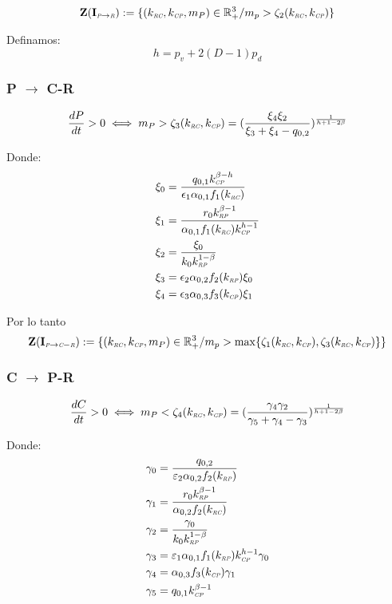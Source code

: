 \begin{equation}
\mathbf{Z(I_{\textit{\tiny P} \to \textit{\tiny R}})} := \{ (k_{\textit{\tiny RC}},k_{\textit{\tiny CP}},m_P) \in \mathbb{R}^3_+ / m_p > \zeta_2(k_{\textit{\tiny RC}},k_{\textit{\tiny CP}}) \}
\end{equation}


Definamos:
\begin{equation}
  h = p_v + 2(D-1)p_d
\end{equation}

\subsubsection{P $\to$ C-R}
\begin{equation}
  \frac{dP}{dt}  >0 \iff m_P > \zeta_3(k_{\textit{\tiny RC}},k_{\textit{\tiny CP}}) = (\frac{\xi_4\xi_2}{\xi_3 + \xi_4 - q_{0,2}})^{\frac{1}{h + 1 - 2\beta}}
\end{equation}

Donde:
\begin{equation}
  \begin{aligned}
    \xi_0 &= \frac{q_{0,1} k_{\textit{\tiny CP}}^{\beta - h}}{\epsilon_1 \alpha_{0,1} f_1(k_{\textit{\tiny RC}})}\\
    \xi_1 &= \frac{r_0 k_{\textit{\tiny RP}}^{\beta -1}}{\alpha_{0,1} f_1(k_{\textit{\tiny RC}}) k_{\textit{\tiny CP}}^{h - 1}}\\
    \xi_2 &= \frac{\xi_0}{k_0 k_{\textit{\tiny RP}}^{1-\beta}} \\
    \xi_3 &= \epsilon_2 \alpha_{0,2} f_2(k_{\textit{\tiny RP}}) \xi_0\\
    \xi_4 &=\epsilon_3 \alpha_{0,3} f_3(k_{\textit{\tiny CP}}) \xi_1
  \end{aligned}
\end{equation}


Por lo tanto 
\begin{equation}
\mathbf{Z(I_{\textit{\tiny P} \to \textit{\tiny C}-\textit{\tiny R}})} := \{ (k_{\textit{\tiny RC}},k_{\textit{\tiny CP}},m_P) \in \mathbb{R}^3_+ / m_p > \max\{\zeta_1(k_{\textit{\tiny RC}},k_{\textit{\tiny CP}}),\zeta_3(k_{\textit{\tiny RC}},k_{\textit{\tiny CP}})\} \}
\end{equation}
\subsubsection{C $\to$ P-R}
\begin{equation}
  \frac{dC}{dt}  >0 \iff m_P < \zeta_4(k_{\textit{\tiny RC}},k_{\textit{\tiny CP}}) = (\frac{\gamma_4\gamma_2}{\gamma_5 + \gamma_4 - \gamma_3})^{\frac{1}{h + 1 - 2\beta}}
\end{equation}

Donde:
\begin{equation}
  \begin{aligned}
    \gamma_0 &= \frac{q_{0,2}}{\varepsilon_2 \alpha_{0,2} f_2(k_{\textit{\tiny RP}})}\\
    \gamma_1 &= \frac{r_0 k_{\textit{\tiny RP}}^{\beta -1}}{\alpha_{0,2} f_2(k_{\textit{\tiny RC}})}\\
    \gamma_2 &= \frac{\gamma_0}{k_0 k_{\textit{\tiny RP}}^{1-\beta}} \\
    \gamma_3 &= \varepsilon_1\alpha_{0,1} f_1(k_{\textit{\tiny RP}}) k_{\textit{\tiny CP}}^{h -1} \gamma_0\\
    \gamma_4 &=\alpha_{0,3} f_3(k_{\textit{\tiny CP}}) \gamma_1 \\
    \gamma_5 &= q_{0,1} k_{\textit{\tiny CP}}^{\beta-1}
  \end{aligned}
\end{equation}

